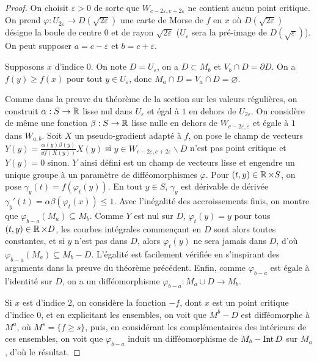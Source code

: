 \begin{proof}
    On choisit $\varepsilon > 0$ de sorte que $W_{c-2\varepsilon,c+2\varepsilon}$ ne contient 
    aucun point critique.
    On prend $\varphi:U_{2\varepsilon}\to D(\sqrt{2\varepsilon})$ une carte de Morse de $f$ 
    en $x$ où $D(\sqrt{2\varepsilon})$ désigne la boule de centre $0$ et de rayon 
    $\sqrt{2\varepsilon}$ ($U_\varepsilon$ sera la pré-image de $D(\sqrt\varepsilon)$).
    On peut supposer $a=c-\varepsilon$ et $b=c+\varepsilon$.

    Supposons $x$ d'indice $0$. 
    On note $D=U_\varepsilon$, on a $D\subset M_b$ et $V_b\cap D=\partial D$.
    On a $f(y)\geq f(x)$ pour tout $y\in U_\varepsilon$, donc $M_a\cap D=V_a\cap D=\varnothing$.

    Comme dans la preuve du théorème de la section sur les valeurs régulières, on construit 
    $\alpha:S\to \operatorname{\mathbb R}$ lisse nul dans $U_\varepsilon$ et égal à $1$ en dehors de $U_{2\varepsilon}$.
    On considère de même une fonction $\beta:S\to\operatorname{\mathbb R}$ lisse nulle en dehors de 
    $W_{c-2\varepsilon,\varepsilon}$ et égale à $1$ dans $W_{a,b}$. 
    Soit $X$ un pseudo-gradient adapté à $f$, on pose le champ de vecteurs 
    $Y(y)=\frac{\alpha(y)\beta(y)}{\dd f(X(y))}X(y)$ si 
    $y\in W_{c-2\varepsilon,c+2\varepsilon}\backslash D$ n'est pas point critique et $Y(y)=0$ sinon.
    $Y$ ainsi défini est un champ de vecteurs lisse et engendre un unique groupe à un paramètre 
    de difféomorphismes $\varphi$. 
    Pour $(t,y)\in\operatorname{\mathbb R}\times S$, on pose $\gamma_y(t)=f(\varphi_t(y))$. En tout $y\in S$, $\gamma_y$ 
    est dérivable de dérivée $\gamma_y'(t)=\alpha\beta(\varphi_t(x))\leq 1$.
    Avec l'inégalité des accroissements finis, on montre que $\varphi_{b-a}(M_a)\subseteq M_b$. 
    Comme $Y$ est nul sur $D$, $\varphi_t(y)=y$ pour tous $(t,y)\in\operatorname{\mathbb R}\times D$, les courbes 
    intégrales commençant en $D$ sont alors toutes constantes, et si $y$ n'est pas dans $D$,
    alors $\varphi_t(y)$ ne sera jamais dans $D$, d'où $\varphi_{b-a}(M_a)\subseteq M_b-D$. 
    L'égalité est facilement vérifiée en s'inspirant des arguments dans la preuve du théorème 
    précédent.
    Enfin, comme $\varphi_{b-a}$ est égale à l'identité sur $D$, on a un difféomorphisme 
    $\varphi_{b-a}:M_a\cup D\to M_b$.
    
    Si $x$ est d'indice $2$, on considère la fonction $-f$, dont $x$ est un point critique 
    d'indice $0$, et en explicitant les ensembles, on voit que $M^b-D$ est difféomorphe à $M^a$,
    où $M^s=\lbrace f\geq s\rbrace$, puis, en considérant les complémentaires des intérieurs 
    de ces ensembles, on voit que $\varphi_{b-a}$ induit un difféomorphisme de $M_b-\operatorname{Int} D$ sur 
    $M_a$, d'où le résultat.
\end{proof}

